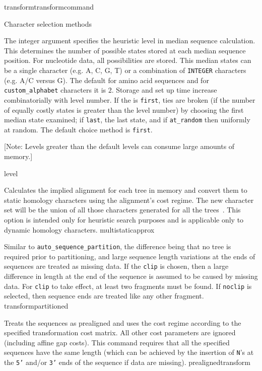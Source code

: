 \begin{command}{transform}{transformcommand}
\begin{arguments}
\begin{argumentgroup}{Character selection methods}
          {The integer argument specifies the heuristic level in median sequence calculation.  
            This determines the number of possible states stored at each median sequence position.  
            For nucleotide data, all possibilities are stored.  This median states can be a single character 
            (e.g. A, C, G, T) or a combination of \texttt{INTEGER}  characters (e.g. A/C versus G).
            The default for amino acid sequences and for \texttt{custom\_alphabet} characters 
            it is $2$.  Storage and set up time increase combinatorially with level number. 
            If the \poylident is \texttt{first}, ties are broken (if the number of equally costly states 
            is greater than the level number) by choosing the first median state examined; 
            if \texttt{last}, the last state, and if \texttt{at\_random} then uniformly at  random.
            The default choice method is \texttt{first}.
            
           [Note: Levels greater than the default levels can consume large amounts of memory.] }
          {level}
                    
            {Calculates the implied alignment for each tree in memory
            and convert them to static homology characters using the alignment's
            cost regime. The new character set will be the union of all those
            characters generated for all the trees~\cite{wheeler1995a}. This option is intended only
            for heuristic search purposes and is applicable only to dynamic homology characters.}
            {multistaticapprox}

            {Similar to \texttt{auto\_sequence\_partition}, the difference being that no tree is
            required prior to partitioning, and large sequence length variations
            at the ends of sequences are treated as missing data. If the \poylident \texttt{clip} 
            is chosen, then a large difference in length at the end of the sequence is assumed to be caused by
            missing data. For \texttt{clip} to take effect, at least two fragments must
            be found. If \poylident \texttt{noclip} is selected, then sequence ends are treated like
            any other fragment.}
            {transformpartitioned}
            
                {Treats the sequences as prealigned and uses the
                cost regime according to the specified transformation cost
                matrix. All other cost parameters are ignored (including affine
                gap costs). This command requires that all the specified sequences 
                have the same length (which can be achieved by the insertion of \texttt{N}'s
                at the \texttt{5'} and/or \texttt{3'} ends of the sequence if data are missing).}
                {prealignedtransform}
            

\end{argumentgroup}
\end{arguments}
\end{command}
